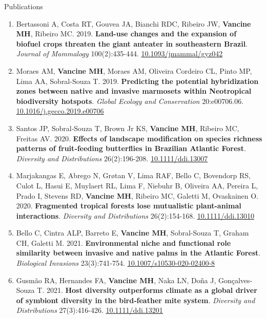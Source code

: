 \documentclass{resume}
\begin{document}
\begin{rSection}{Publications}
\begin{enumerate}
\item Bertassoni A, Costa RT, Gouvea JA, Bianchi RDC, Ribeiro JW, {\bf Vancine MH}, Ribeiro MC. 2019. {\bf Land-use changes and the expansion of biofuel crops threaten the giant anteater in southeastern Brazil}. {\it Journal of Mammalogy} 100(2):435-444. \href{https://doi.org/10.1093/jmammal/gyz042}{\underline{10.1093/jmammal/gyz042}}

\item Moraes AM, {\bf Vancine MH}, Moraes AM, Oliveira Cordeiro CL, Pinto MP, Lima AA, Sobral-Souza T. 2019. {\bf Predicting the potential hybridization zones between native and invasive marmosets within Neotropical biodiversity hotspots}. {\it Global Ecology and Conservation} 20:e00706.06. \href{https://doi.org/10.1016/j.gecco.2019.e00706}{\underline{10.1016/j.gecco.2019.e00706}}

\item Santos JP, Sobral‐Souza T, Brown Jr KS, {\bf Vancine MH}, Ribeiro MC, Freitas AV. 2020. {\bf Effects of landscape modification on species richness patterns of fruit‐feeding butterflies in Brazilian Atlantic Forest}. {\it Diversity and Distributions} 26(2):196-208. \href{https://doi.org/10.1111/ddi.13007}{\underline{10.1111/ddi.13007}}

\item Marjakangas E, Abrego N, Grøtan V, Lima RAF, Bello C, Bovendorp RS, Culot L, Hasui E, Muylaert RL, Lima F, Niebuhr B, Oliveira AA, Pereira L, Prado I, Stevens RD, {\bf Vancine MH}, Ribeiro MC, Galetti M, Ovaskainen O. 2020. {\bf Fragmented tropical forests lose mutualistic plant-animal interactions}. {\it Diversity and Distributions} 26(2):154-168. \href{https://doi.org/10.1111/ddi.13010}{\underline{10.1111/ddi.13010}}

\item Bello C, Cintra ALP, Barreto E, {\bf Vancine MH}, Sobral-Souza T, Graham CH, Galetti M. 2021. {\bf Environmental niche and functional role similarity between invasive and native palms in the Atlantic Forest}. {\it Biological Invasions} 23(3):741-754. \href{https://doi.org/10.1007/s10530-020-02400-8}{\underline{10.1007/s10530-020-02400-8}}

\item Gusmão RA, Hernandes FA, {\bf Vancine MH}, Naka LN, Doña J, Gonçalves‐Souza T. 2021. {\bf Host diversity outperforms climate as a global driver of symbiont diversity in the bird‐feather mite system}. {\it Diversity and Distributions} 27(3):416-426. \href{https://doi.org/10.1111/ddi.13201}{\underline{10.1111/ddi.13201}}


\end{enumerate}
\end{rSection}
\end{document}
